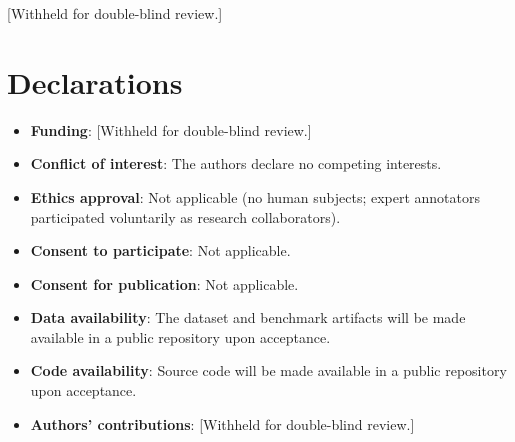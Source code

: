 \documentclass[pdflatex,sn-basic,Numbered]{sn-jnl}
\begin{document}
\backmatter


[Withheld for double-blind review.]

\section*{Declarations}

\begin{itemize}
\item \textbf{Funding}: [Withheld for double-blind review.]
\item \textbf{Conflict of interest}: The authors declare no competing interests.
\item \textbf{Ethics approval}: Not applicable (no human subjects; expert annotators participated voluntarily as research collaborators).
\item \textbf{Consent to participate}: Not applicable.
\item \textbf{Consent for publication}: Not applicable.
\item \textbf{Data availability}: The dataset and benchmark artifacts will be made available in a public repository upon acceptance.
\item \textbf{Code availability}: Source code will be made available in a public repository upon acceptance.
\item \textbf{Authors' contributions}: [Withheld for double-blind review.]
\end{itemize}


\end{document}

